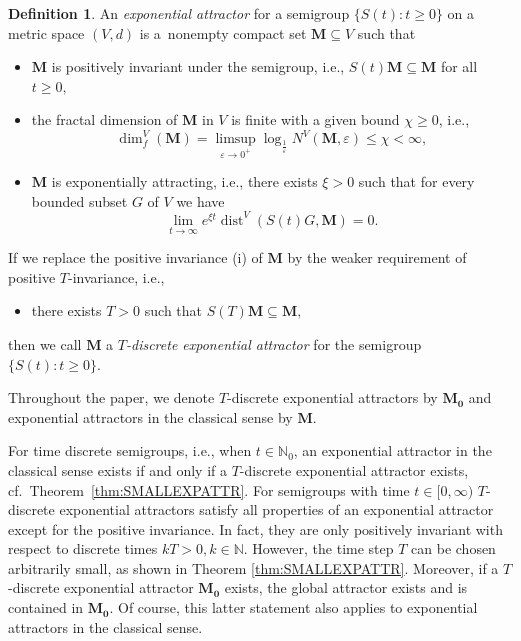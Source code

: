 \documentclass[a4paper,12pt,reqno]{amsart}
\theoremstyle{plain}
\theoremstyle{definition}
\newtheorem{defn}[lem]{Definition}
\numberwithin{equation}{section}
\newcommand{\eps}{\varepsilon}
\newcommand{\dist}{\operatorname{dist}}
\newcommand{\dimf}{\operatorname{dim}_{f}}
\renewcommand{\geq}{\geqslant}
\renewcommand{\leq}{\leqslant}
\begin{document}
\begin{defn}\label{defn:EXPAT}
An \emph{exponential attractor} for a semigroup $\{S(t)\colon t\geq 0\}$ on a metric space $(V,d)$ is a~nonempty compact set $\mathbf{M}\subseteq V$ such that
\begin{itemize}
\item[(i)] $\mathbf{M}$ is positively invariant under the semigroup, i.e., $S(t)\mathbf{M}\subseteq\mathbf{M}$ for all $t\geq 0,$
\item[(ii)] the fractal dimension of $\mathbf{M}$ in $V$ is finite with a given bound $\chi\geq 0$,
i.e.,
$$\dimf^{V}(\mathbf{M})=\limsup_{\eps\to0^{+}}\log_{\frac{1}{\eps}}N^{V}(\mathbf{M},\eps)\leq\chi<\infty,$$
\item[(iii)]  $\mathbf{M}$ is exponentially attracting, i.e., there exists $\xi>0$ such that for every bounded subset $G$ of $V$ we have
$$\lim_{t\to\infty}e^{\xi t}\dist^{V}(S(t)G,\mathbf{M})=0.$$
\end{itemize}

If we replace the positive invariance (i) of $\mathbf{M}$ by the weaker requirement of positive $T$-invariance, i.e.,
\begin{itemize}
\item[(i')] there exists  $T>0$ such that $S(T)\mathbf{M}\subseteq\mathbf{M},$
\end{itemize}
then we call $\mathbf{M}$ a \emph{$T$-discrete exponential attractor} for the semigroup $\{S(t)\colon t\geq 0\}$.
\end{defn}

Throughout the paper, we denote $T$-discrete exponential attractors by $\mathbf{M_0}$ and exponential attractors in the classical sense by $\mathbf{M}$.

For time discrete semigroups, i.e., when $t\in\mathbb{N}_0$,  an exponential attractor in the classical sense exists if and only if a $T$-discrete exponential attractor exists, cf.~Theorem~\ref{thm:SMALLEXPATTR}.
For semigroups with time $t\in[0,\infty)$ $T$-discrete exponential attractors satisfy all properties of an exponential attractor except for the positive invariance. In fact, they are only positively invariant with respect to discrete times $kT>0, k\in\mathbb{N}$. However, the time step $T$ can be chosen arbitrarily small, as shown in Theorem \ref{thm:SMALLEXPATTR}.  
Moreover, if a $T$-discrete exponential attractor $\mathbf{M_0}$ exists, the global attractor exists and is contained in $\mathbf{M_0}$. Of course, this latter statement also applies to exponential attractors in the classical sense.
\end{document}
